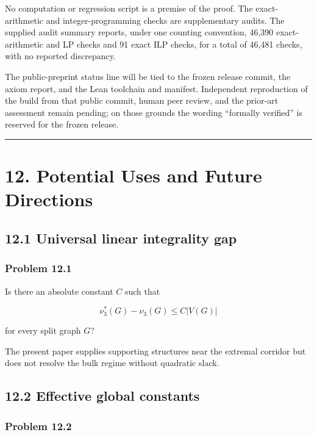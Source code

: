 \documentclass[
  11pt,
]{article}
\begin{document}
No computation or regression script is a premise of the proof. The exact-arithmetic and integer-programming checks are supplementary audits. The supplied audit summary reports, under one counting convention, 46,390 exact-arithmetic and LP checks and 91 exact ILP checks, for a total of 46,481 checks, with no reported discrepancy.

The public-preprint status line will be tied to the frozen release commit, the axiom report, and the Lean toolchain and manifest. Independent reproduction of the build from that public commit, human peer review, and the prior-art assessment remain pending; on those grounds the wording ``formally verified'' is reserved for the frozen release.

\begin{center}\rule{0.5\linewidth}{0.5pt}\end{center}

\section{12. Potential Uses and Future Directions}\label{potential-uses-and-future-directions}

\subsection{12.1 Universal linear integrality gap}\label{universal-linear-integrality-gap}

\subsubsection{Problem 12.1}\label{problem-12.1}

Is there an absolute constant \(C\) such that

\[
\nu_3^*(G)-\nu_3(G)
\le C|V(G)|
\]

for every split graph \(G\)?

The present paper supplies supporting structures near the extremal corridor but does not resolve the bulk regime without quadratic slack.

\subsection{12.2 Effective global constants}\label{effective-global-constants}

\subsubsection{Problem 12.2}\label{problem-12.2}
\end{document}
